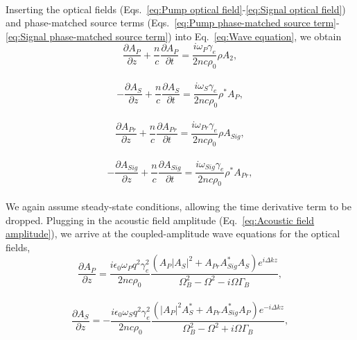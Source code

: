 \\
Inserting the optical fields (Eqs.~\ref{eq:Pump optical field}-\ref{eq:Signal optical field}) and phase-matched source terms (Eqs.~\ref{eq:Pump phase-matched source term}-\ref{eq:Signal phase-matched source term}) into Eq.~\ref{eq:Wave equation}, we obtain
\\
\begin{equation}
    \frac{\partial A_{P}}{\partial z} + \frac{n}{c}\frac{\partial A_{P}}{\partial t} = \frac{i\omega_{P}\gamma_{e}}{2nc\rho_{0}}\rho A_{2},
\end{equation}
\\
\begin{equation}
    -\frac{\partial A_{S}}{\partial z} + \frac{n}{c}\frac{\partial A_{S}}{\partial t} = \frac{i\omega_{S}\gamma_{e}}{2nc\rho_{0}}\rho^{*}A_{P},
\end{equation}
\\
\begin{equation}
    \frac{\partial A_{Pr}}{\partial z} + \frac{n}{c}\frac{\partial A_{Pr}}{\partial t} = \frac{i\omega_{Pr}\gamma_{e}}{2nc\rho_{0}}\rho A_{Sig},
\end{equation}
\\
\begin{equation}
    -\frac{\partial A_{Sig}}{\partial z} + \frac{n}{c}\frac{\partial A_{Sig}}{\partial t} = \frac{i\omega_{Sig}\gamma_{e}}{2nc\rho_{0}}\rho^{*}A_{Pr},
\end{equation}
\\
We again assume steady-state conditions, allowing the time derivative term to be dropped. Plugging in the acoustic field amplitude (Eq.~\ref{eq:Acoustic field amplitude}), we arrive at the coupled-amplitude wave equations for the optical fields,
\\
\begin{equation}
    \frac{\partial A_{P}}{\partial z} = \frac{i\epsilon_{0}\omega_{P} q^{2}\gamma_{e}^{2}}{2nc\rho_{0}}\frac{(A_{P}|A_{S}|^{2} + A_{Pr}A_{Sig}^{*}A_{S})e^{i\Delta kz}}{\Omega_{B}^{2} - \Omega^{2} - i\Omega\Gamma_{B}},
    \label{eq:Pump coupled-amplitude wave equation}
\end{equation}
\\
\begin{equation}
    \frac{\partial A_{S}}{\partial z} = -\frac{i\epsilon_{0}\omega_{S} q^{2}\gamma_{e}^{2}}{2nc\rho_{0}}\frac{(|A_{P}|^{2}A_{S}^{*} + A_{Pr}A_{Sig}^{*}A_{P})e^{-i\Delta kz}}{\Omega_{B}^{2} - \Omega^{2} + i\Omega\Gamma_{B}},
\end{equation}
\\
